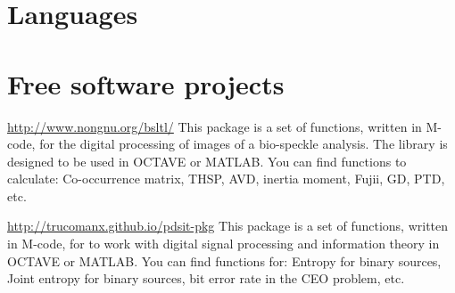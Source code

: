 \documentclass[11pt,a4paper,sans]{moderncv} %
\begin{document}





\section{Languages}


 
\section{Free software projects}

			{\url{http://www.nongnu.org/bsltl/}}
			{}{}
			{This package is a set of functions, written in M-code, 
			for the digital processing of images  of a bio-speckle analysis.
			The library is designed to be used in OCTAVE or MATLAB.
			You can find functions to calculate:
			Co-occurrence matrix, THSP, AVD, inertia moment,
			Fujii, GD, PTD, etc.}

			{\url{http://trucomanx.github.io/pdsit-pkg}}
			{}{}
			{This package is a set of functions, written in M-code, for to work
			with digital signal processing and information theory
			in OCTAVE or MATLAB. You can find functions for:
			Entropy for binary sources, Joint entropy for binary sources,
			bit error rate in the CEO problem, etc. }
			
\end{document}
